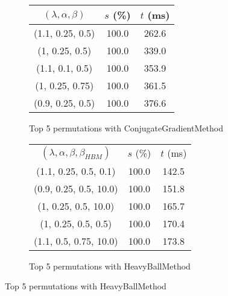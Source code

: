 \begin{figure}[H]
{\begin{subfigure}[ht]{.6\textwidth}
\begin{tabular}{|c|c|c|}
\hline
\rowcolor{gray!25}
$(\lambda,\alpha,\beta)$ & $s$ (\%) & $t$ (ms) \\
\hline
(1.1, 0.25, 0.5) & 100.0 & 262.6 \\
(1, 0.25, 0.5) & 100.0 & 339.0 \\
(1.1, 0.1, 0.5) & 100.0 & 353.9 \\
(1, 0.25, 0.75) & 100.0 & 361.5 \\
(0.9, 0.25, 0.5) & 100.0 & 376.6 \\
\hline
\end{tabular}
\caption{Top 5 permutations with ConjugateGradientMethod}
\label{subfig:param_comp_MatrixSquareSum_ConjugateGradientMethod_ArmijoSearch}
\end{subfigure}
\hfill
\begin{subfigure}[ht]{.6\textwidth}
\centering
{}
\begin{tabular}{|c|c|c|}
\hline
\rowcolor{gray!25}
\multicolumn{3}{|c|}{HeavyBallMethod} \\
\hline
\rowcolor{gray!25}
$(\lambda,\alpha,\beta,\beta_{HBM})$ & $s$ (\%) & $t$ (ms) \\
\hline
(1.1, 0.25, 0.5, 0.1) & 100.0 & 142.5 \\
(0.9, 0.25, 0.5, 10.0) & 100.0 & 151.8 \\
(1, 0.25, 0.5, 10.0) & 100.0 & 165.7 \\
(1, 0.25, 0.5, 0.5) & 100.0 & 170.4 \\
(1.1, 0.5, 0.75, 10.0) & 100.0 & 173.8 \\
\hline
\end{tabular}
\caption{Top 5 permutations with HeavyBallMethod}
\label{subfig:param_comp_MatrixSquareSum_HeavyBallMethod_ArmijoSearch}
\end{subfigure}
}
\end{figure}

